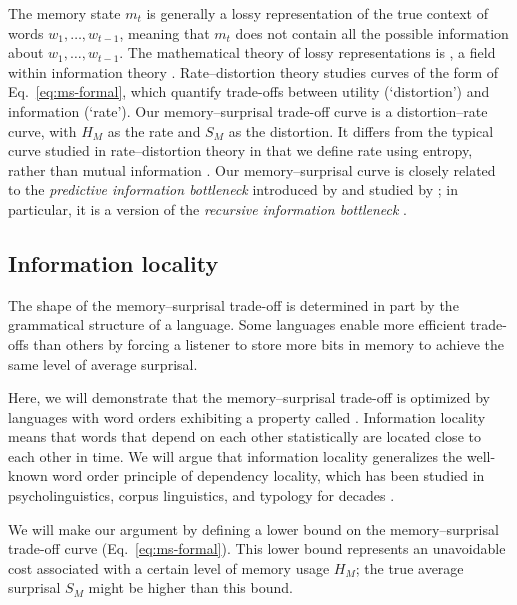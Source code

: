The memory state $m_t$ is generally a lossy representation of the true context of words $w_1, \dots, w_{t-1}$, meaning that $m_t$ does not contain all the possible information about $w_1, \dots, w_{t-1}$. The mathematical theory of lossy representations is , a field within information theory \citep[for an overview and key results, see][pp. 301--347]{cover2006elements}. Rate--distortion theory studies curves of the form of Eq.~\ref{eq:ms-formal}, which quantify trade-offs between utility (`distortion') and information (`rate'). Our memory--surprisal trade-off curve is a distortion--rate curve, with $H_M$ as the rate and $S_M$ as the distortion. It differs from the typical curve studied in rate--distortion theory in that we define rate using entropy, rather than mutual information \citep[see][for a discussion of some of the consequences of this formulation]{strouse-deterministic-2017}. Our memory--surprisal curve is closely related to the \emph{predictive information bottleneck} introduced by \citet{still-information-2014} and studied by \citet{marzen-predictive-2016}; in particular, it is a version of the \emph{recursive information bottleneck} \citep[][\S 4]{still-information-2014}. 


\subsection{Information locality}

The shape of the memory--surprisal trade-off is determined in part by the grammatical structure of a language.
Some languages enable more efficient trade-offs than others by forcing a listener to store more bits in memory to achieve the same level of average surprisal.

Here, we will demonstrate that the memory--surprisal trade-off is optimized by languages with word orders exhibiting a property called . Information locality means that words that depend on each other statistically are located close to each other in time. We will argue that information locality generalizes the well-known word order principle of dependency locality, which has been studied in psycholinguistics, corpus linguistics, and typology for decades \citep{rijkhoff-word-1986,hawkins-performance-1994,gibson-linguistic-1998,liu-dependency-2018,futrell-large-scale-2015,liu-dependency-2017,temperley-minimizing-2018}. 

We will make our argument by defining a lower bound on the memory--surprisal trade-off curve (Eq.~\ref{eq:ms-formal}). This lower bound represents an unavoidable cost associated with a certain level of memory usage $H_M$; the true average surprisal $S_M$ might be higher than this bound. 

